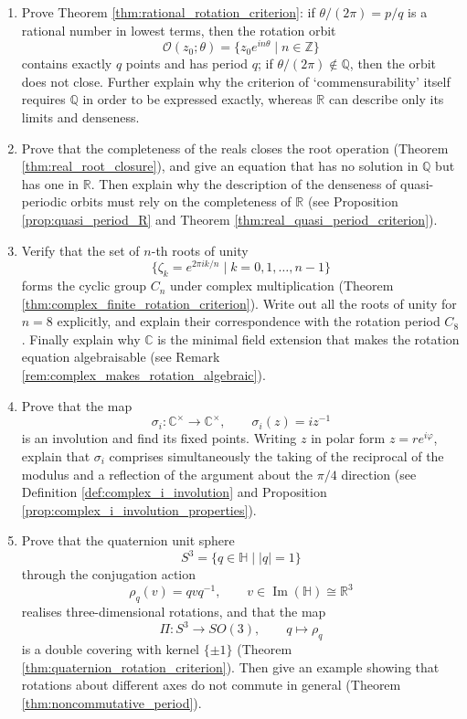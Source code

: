 \begin{enumerate}[leftmargin=3em, label=\textbf{Exercise \arabic*}]
    \item Prove Theorem \ref{thm:rational_rotation_criterion}:
    if $\theta/(2\pi)=p/q$ is a rational number in lowest terms, then the rotation orbit
    \[
    \mathcal{O}(z_0;\theta)=\{z_0e^{in\theta}\mid n\in\mathbb{Z}\}
    \]
    contains exactly $q$ points and has period $q$;
    if $\theta/(2\pi)\notin\mathbb{Q}$, then the orbit does not close.
    Further explain why the criterion of `commensurability' itself requires $\mathbb{Q}$
    in order to be expressed exactly, whereas $\mathbb{R}$ can describe only its limits and denseness.

    \item Prove that the completeness of the reals closes the root operation (Theorem \ref{thm:real_root_closure}),
    and give an equation that has no solution in $\mathbb{Q}$ but has one in $\mathbb{R}$.
    Then explain why the description of the denseness of quasi-periodic orbits must rely on the completeness of $\mathbb{R}$
    (see Proposition \ref{prop:quasi_period_R} and Theorem \ref{thm:real_quasi_period_criterion}).

    \item Verify that the set of $n$-th roots of unity
    \[
    \{\zeta_k=e^{2\pi ik/n}\mid k=0,1,\dots,n-1\}
    \]
    forms the cyclic group $C_n$ under complex multiplication (Theorem \ref{thm:complex_finite_rotation_criterion}).
    Write out all the roots of unity for $n=8$ explicitly, and explain their correspondence with the rotation period $C_8$.
    Finally explain why $\mathbb{C}$ is the minimal field extension that makes the rotation equation algebraisable
    (see Remark \ref{rem:complex_makes_rotation_algebraic}).

    \item Prove that the map
    \[
    \sigma_i:\mathbb{C}^{\times}\to\mathbb{C}^{\times},\qquad
    \sigma_i(z)=iz^{-1}
    \]
    is an involution and find its fixed points. Writing $z$ in polar form $z=re^{i\varphi}$,
    explain that $\sigma_i$ comprises simultaneously the taking of the reciprocal of the modulus and a reflection of the argument about the $\pi/4$ direction
    (see Definition \ref{def:complex_i_involution} and Proposition \ref{prop:complex_i_involution_properties}).

    \item Prove that the quaternion unit sphere
    \[
    S^3=\{q\in\mathbb{H}\mid |q|=1\}
    \]
    through the conjugation action
    \[
    \rho_q(v)=qvq^{-1},\qquad v\in\operatorname{Im}(\mathbb{H})\cong\mathbb{R}^3
    \]
    realises three-dimensional rotations, and that the map
    \[
    \Pi:S^3\to SO(3),\qquad q\mapsto\rho_q
    \]
    is a double covering with kernel $\{\pm1\}$ (Theorem \ref{thm:quaternion_rotation_criterion}).
    Then give an example showing that rotations about different axes do not commute in general (Theorem \ref{thm:noncommutative_period}).


\end{enumerate}
